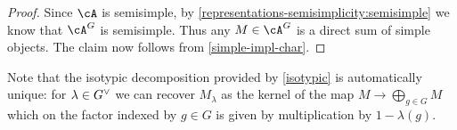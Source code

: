 \begin{proof}
  Since $\cA$ is semisimple, by \cref{representations-semisimplicity:semisimple} we know that $\cA^G$ is semisimple. Thus any $M \in \cA^G$ is a direct sum of simple objects. The claim now follows from \cref{simple-impl-char}.
\end{proof}

\begin{remark}
  \label{isotypic-unique}
  Note that the isotypic decomposition provided by \cref{isotypic} is automatically unique: for $\lambda \in G^\vee$ we can recover $M_\lambda$ as the kernel of the map $M \to \bigoplus_{g \in G} M$ which on the factor indexed by $g \in G$ is given by multiplication by $1 - \lambda(g)$.
\end{remark}


% 
% 


